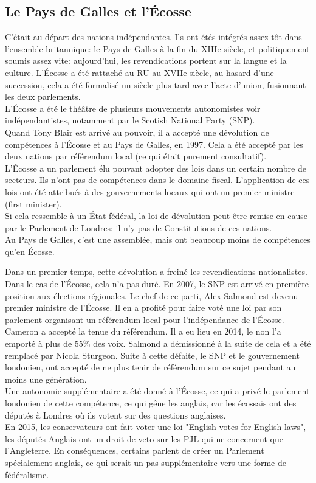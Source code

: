 \documentclass[10pt, a4paper, openany]{book}
\begin{document}
\subsection{Le Pays de Galles et l'Écosse}

C'était au départ des nations indépendantes. Ils ont étés intégrés assez tôt dans l'ensemble britannique: le Pays de Galles à la fin du XIIIe siècle, et politiquement soumis assez vite: aujourd'hui, les revendications portent sur la langue et la culture. L'Écosse a été rattaché au RU au XVIIe siècle, au hasard d'une succession, cela a été formalisé un siècle plus tard avec l'acte d'union, fusionnant les deux parlements. \\
L'Écosse a été le théâtre de plusieurs mouvements autonomistes voir indépendantistes, notamment par le Scotish National Party (SNP). \\
Quand Tony Blair est arrivé au pouvoir, il a accepté une dévolution de compétences à l'Écosse et au Pays de Galles, en 1997. Cela a été accepté par les deux nations par référendum local (ce qui était purement consultatif). \\
L'Écosse a un parlement élu pouvant adopter des lois dans un certain nombre de secteurs. Ils n'ont pas de compétences dans le domaine fiscal. L'application de ces lois ont été attribués à des gouvernements locaux qui ont un premier ministre (first minister). \\
Si cela ressemble à un État fédéral, la loi de dévolution peut être remise en cause par le Parlement de Londres: il n'y pas de Constitutions de ces nations. \\
Au Pays de Galles, c'est une assemblée, mais ont beaucoup moins de compétences qu'en Écosse. 


Dans un premier temps, cette dévolution a freiné les revendications nationalistes. Dans le cas de l'Écosse, cela n'a pas duré. En 2007, le SNP est arrivé en première position aux élections régionales. Le chef de ce parti, Alex Salmond est devenu premier ministre de l'Écosse. Il en a profité pour faire voté une loi par son parlement organisant un référendum local pour l'indépendance de l'Écosse. \\
Cameron a accepté la tenue du référendum. Il a eu lieu en 2014, le non l'a emporté à plus de 55\% des voix. Salmond a démissionné à la suite de cela et a été remplacé par Nicola Sturgeon. Suite à cette défaite, le SNP et le gouvernement londonien, ont accepté de ne plus tenir de référendum sur ce sujet pendant au moins une génération. \\
Une autonomie supplémentaire a été donné à l'Écosse, ce qui a privé le parlement londonien de cette compétence, ce qui gêne les anglais, car les écossais ont des députés à Londres où ils votent sur des questions anglaises. \\
En 2015, les conservateurs ont fait voter une loi "English votes for English laws", les députés Anglais ont un droit de veto sur les PJL qui ne concernent que l'Angleterre. En conséquences, certains parlent de créer un Parlement spécialement anglais, ce qui serait un pas supplémentaire vers une forme de fédéralisme. 
\end{document}
